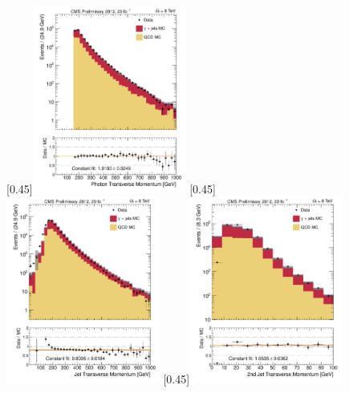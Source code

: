 \begin{figure}[p]
    \centering
    \subcaptionbox{\label{pt_photon}}[0.45\textwidth]{\includegraphics[width=0.45\textwidth]{chapitre4/figs/ptPhoton_passedID_log.pdf}}\hfill
    \subcaptionbox{\label{pt_first_jet}}[0.45\textwidth]{\includegraphics[width=0.45\textwidth]{chapitre4/figs/ptFirstJet_passedID_log.pdf}}
    \subcaptionbox{\label{pt_second_jet}}[0.45\textwidth]{\includegraphics[width=0.45\textwidth]{chapitre4/figs/ptSecondJet_passedID_log.pdf}}\hfill

\end{figure}
